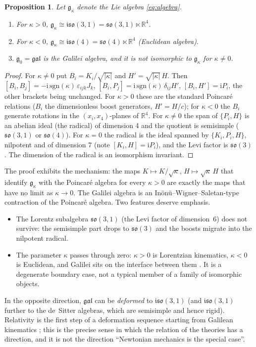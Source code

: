 \documentclass[11pt,a4paper]{article}
\newcommand{\ii}{\mathrm{i}}
\newcommand{\eps}{\varepsilon}
\newcommand{\R}{\mathbb{R}}
\newcommand{\gal}{\mathfrak{gal}}
\newcommand{\poinc}{\mathfrak{iso}(3,1)}
\theoremstyle{plain}
\newtheorem{proposition}{Proposition}
\theoremstyle{definition}
\theoremstyle{remark}
\begin{document}
\begin{proposition}\label{prop:contraction}
Let $\mathfrak g_\kappa$ denote the Lie algebra \eqref{eq:algebra}.
\begin{enumerate}[label=(\alph*),itemsep=1pt]
\item For $\kappa>0$, $\mathfrak g_\kappa\cong\poinc=\mathfrak{so}(3,1)\ltimes\R^4$.
\item For $\kappa<0$, $\mathfrak g_\kappa\cong\mathfrak{iso}(4)=\mathfrak{so}(4)\ltimes\R^4$ (Euclidean algebra).
\item $\mathfrak g_0=\gal$ is the Galilei algebra, and it is \emph{not} isomorphic to $\mathfrak g_\kappa$ for
$\kappa\neq0$.
\end{enumerate}
\end{proposition}
\begin{proof}
For $\kappa\ne0$ put $B_i=K_i/\sqrt{|\kappa|}$ and $H'=\sqrt{|\kappa|}\,H$. Then
$[B_i,B_j]=-\ii\,\mathrm{sgn}(\kappa)\,\eps_{ijk}J_k$, $[B_i,P_j]=\ii\,\mathrm{sgn}(\kappa)\,\delta_{ij}H'$,
$[B_i,H']=\ii P_i$, the other brackets being unchanged. For $\kappa>0$ these are the standard
Poincar\'e relations ($B_i$ the dimensionless boost generators, $H'=H/c$); for $\kappa<0$ the
$B_i$ generate rotations in the $(x_i,x_4)$-planes of $\R^4$.
For $\kappa\neq 0$ the span of $\{P_i,H\}$ is an abelian ideal (the radical) of dimension 4 and the
quotient is semisimple ($\mathfrak{so}(3,1)$ or $\mathfrak{so}(4)$). For $\kappa=0$ the radical is
the ideal spanned by $\{K_i,P_i,H\}$, nilpotent and of dimension 7 (note $[K_i,H]=\ii P_i$), and the
Levi factor is $\mathfrak{so}(3)$. The dimension of the radical is an isomorphism invariant. \qedhere
\end{proof}

The proof exhibits the mechanism: the maps $K\mapsto K/\sqrt{\kappa}$, $H\mapsto\sqrt{\kappa}\,H$
that identify $\mathfrak g_\kappa$ with the Poincar\'e algebra for every $\kappa>0$ are exactly
the maps that have no limit as $\kappa\to0$. The Galilei algebra is an
In\"on\"u--Wigner--Saletan-type contraction \cite{IW53,Saletan61} of the Poincar\'e algebra.
Two features deserve emphasis.
\begin{itemize}[itemsep=1pt]
\item The Lorentz subalgebra $\mathfrak{so}(3,1)$ (the Levi factor of dimension~6) does not survive:
the semisimple part drops to $\mathfrak{so}(3)$ and the boosts migrate into the nilpotent radical.
\item The parameter $\kappa$ passes through zero: $\kappa>0$ is Lorentzian kinematics, $\kappa<0$ is
Euclidean, and Galilei sits on the interface between them \cite{BLL68}. It is a degenerate
boundary case, not a typical member of a family of isomorphic objects.
\end{itemize}
In the opposite direction, $\gal$ can be \emph{deformed} to $\poinc$ (and $\poinc$ further to the
de~Sitter algebras, which are semisimple and hence rigid). Relativity is the first step of a
deformation sequence starting from Galilean kinematics \cite{Dyson72,VM94}; this is the precise sense
in which the relation of the theories has a direction, and it is not the direction ``Newtonian
mechanics is the special case''.
\end{document}
